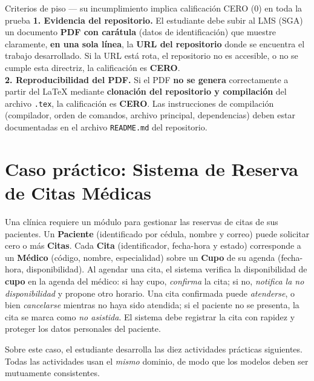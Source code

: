 \documentclass[11pt,a4paper,oneside]{article}
\begin{document}
\begin{piso}{Criterios de piso --- su incumplimiento implica calificaci\'on CERO (0) en toda la prueba}
\textbf{1. Evidencia del repositorio.} El estudiante debe subir al LMS (SGA) un documento \textbf{PDF con car\'atula} (datos de identificaci\'on) que muestre claramente, \textbf{en una sola l\'inea}, la \textbf{URL del repositorio} donde se encuentra el trabajo desarrollado. Si la URL est\'a rota, el repositorio no es accesible, o no se cumple esta directriz, la calificaci\'on es \textbf{CERO}.\\[3pt]
\textbf{2. Reproducibilidad del PDF.} Si el PDF \textbf{no se genera} correctamente a partir del LaTeX mediante \textbf{clonaci\'on del repositorio y compilaci\'on} del archivo \texttt{.tex}, la calificaci\'on es \textbf{CERO}. Las instrucciones de compilaci\'on (compilador, orden de comandos, archivo principal, dependencias) deben estar documentadas en el archivo \texttt{README.md} del repositorio.
\end{piso}

\section{Caso pr\'actico: Sistema de Reserva de Citas M\'edicas}

Una cl\'inica requiere un m\'odulo para gestionar las reservas de citas de sus pacientes. Un \textbf{Paciente} (identificado por c\'edula, nombre y correo) puede solicitar cero o m\'as \textbf{Citas}. Cada \textbf{Cita} (identificador, fecha-hora y estado) corresponde a un \textbf{M\'edico} (c\'odigo, nombre, especialidad) sobre un \textbf{Cupo} de su agenda (fecha-hora, disponibilidad). Al agendar una cita, el sistema verifica la disponibilidad de \textbf{cupo} en la agenda del m\'edico: si hay cupo, \emph{confirma} la cita; si no, \emph{notifica la no disponibilidad} y propone otro horario. Una cita confirmada puede \emph{atenderse}, o bien \emph{cancelarse} mientras no haya sido atendida; si el paciente no se presenta, la cita se marca como \emph{no asistida}. El sistema debe registrar la cita con rapidez y proteger los datos personales del paciente.

Sobre este caso, el estudiante desarrolla las diez actividades pr\'acticas siguientes. Todas las actividades usan el \emph{mismo} dominio, de modo que los modelos deben ser mutuamente consistentes.

\end{document}
